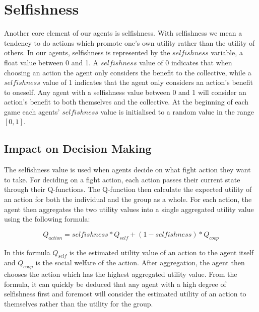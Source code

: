 
\section{Selfishness}

Another core element of our agents is selfishness. With selfishness we mean a tendency to do actions which promote one's own utility rather than the utility of others. In our agents, selfishness is represented by the $selfishness$ variable, a float value between 0 and 1. A $selfishness$ value of 0 indicates that when choosing an action the agent only considers the benefit to the collective, while a $selfishness$ value of 1 indicates that the agent only considers an action's benefit to oneself. Any agent with a selfishness value between 0 and 1 will consider an action's benefit to both themselves and the collective. At the beginning of each game each agents' $selfishness$ value is initialised to a random value in the range $[0,1]$. 


\subsection{Impact on Decision Making}

The selfishness value is used when agents decide on what fight action they want to take. For deciding on a fight action, each action passes their current state through their Q-functions. The Q-function then calculate the expected utility of an action for both the individual and the group as a whole. For each action, the agent then aggregates the two utility values into a single aggregated utility value using the following formula:

\begin{equation}
    Q_{action} = selfishness*Q_{self} + (1 - selfishness)*Q_{coop}
\end{equation}

In this formula $Q_{self}$ is the estimated utility value of an action to the agent itself and $Q_{coop}$ is the social welfare of the action. After aggregation, the agent then chooses the action which has the highest aggregated utility value. From the formula, it can quickly be deduced that any agent with a high degree of selfishness first and foremost will consider the estimated utility of an action to themselves rather than the utility for the group.

